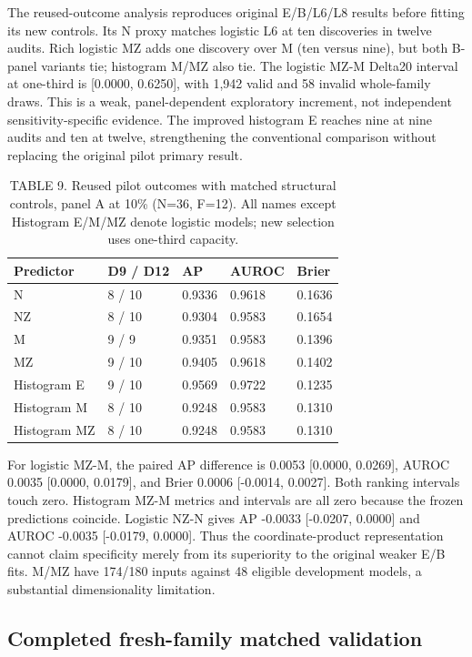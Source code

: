 The reused-outcome analysis reproduces original E/B/L6/L8 results before fitting its new controls. Its N proxy matches logistic L6 at ten discoveries in twelve audits. Rich logistic MZ adds one discovery over M (ten versus nine), but both B-panel variants tie; histogram M/MZ also tie. The logistic MZ-M Delta20 interval at one-third is [0.0000, 0.6250], with 1,942 valid and 58 invalid whole-family draws. This is a weak, panel-dependent exploratory increment, not independent sensitivity-specific evidence. The improved histogram E reaches nine at nine audits and ten at twelve, strengthening the conventional comparison without replacing the original pilot primary result.

\begin{table}[t]
\caption{TABLE 9. Reused pilot outcomes with matched structural controls, panel A at 10\% (N=36, F=12). All names except Histogram E/M/MZ denote logistic models; new selection uses one-third capacity.}
\centering\small
\begin{tabular}{lllll}
\toprule Predictor & D9 / D12 & AP & AUROC & Brier\\\midrule
N & 8 / 10 & 0.9336 & 0.9618 & 0.1636\\
NZ & 8 / 10 & 0.9304 & 0.9583 & 0.1654\\
M & 9 / 9 & 0.9351 & 0.9583 & 0.1396\\
MZ & 9 / 10 & 0.9405 & 0.9618 & 0.1402\\
Histogram E & 9 / 10 & 0.9569 & 0.9722 & 0.1235\\
Histogram M & 8 / 10 & 0.9248 & 0.9583 & 0.1310\\
Histogram MZ & 8 / 10 & 0.9248 & 0.9583 & 0.1310\\\bottomrule
\end{tabular}
\end{table}


For logistic MZ-M, the paired AP difference is 0.0053 [0.0000, 0.0269], AUROC 0.0035 [0.0000, 0.0179], and Brier 0.0006 [-0.0014, 0.0027]. Both ranking intervals touch zero. Histogram MZ-M metrics and intervals are all zero because the frozen predictions coincide. Logistic NZ-N gives AP -0.0033 [-0.0207, 0.0000] and AUROC -0.0035 [-0.0179, 0.0000]. Thus the coordinate-product representation cannot claim specificity merely from its superiority to the original weaker E/B fits. M/MZ have 174/180 inputs against 48 eligible development models, a substantial dimensionality limitation.

\subsection{Completed fresh-family matched validation}

